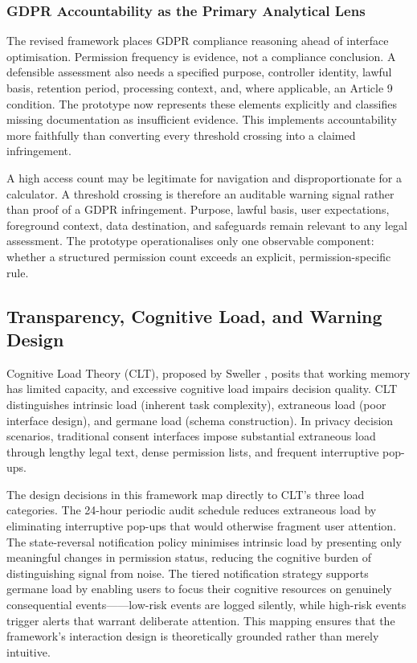 \subsubsection{GDPR Accountability as the Primary Analytical Lens}

The revised framework places GDPR compliance reasoning ahead of interface optimisation. Permission frequency is evidence, not a compliance conclusion. A defensible assessment also needs a specified purpose, controller identity, lawful basis, retention period, processing context, and, where applicable, an Article 9 condition. The prototype now represents these elements explicitly and classifies missing documentation as insufficient evidence. This implements accountability more faithfully than converting every threshold crossing into a claimed infringement.

A high access count may be legitimate for navigation and disproportionate for a calculator. A threshold crossing is therefore an auditable warning signal rather than proof of a GDPR infringement. Purpose, lawful basis, user expectations, foreground context, data destination, and safeguards remain relevant to any legal assessment. The prototype operationalises only one observable component: whether a structured permission count exceeds an explicit, permission-specific rule.

\subsection{Transparency, Cognitive Load, and Warning Design}

Cognitive Load Theory (CLT), proposed by Sweller \cite{27}, posits that working memory has limited capacity, and excessive cognitive load impairs decision quality. CLT distinguishes intrinsic load (inherent task complexity), extraneous load (poor interface design), and germane load (schema construction). In privacy decision scenarios, traditional consent interfaces impose substantial extraneous load through lengthy legal text, dense permission lists, and frequent interruptive pop-ups.

The design decisions in this framework map directly to CLT's three load categories. The 24-hour periodic audit schedule reduces extraneous load by eliminating interruptive pop-ups that would otherwise fragment user attention. The state-reversal notification policy minimises intrinsic load by presenting only meaningful changes in permission status, reducing the cognitive burden of distinguishing signal from noise. The tiered notification strategy supports germane load by enabling users to focus their cognitive resources on genuinely consequential events——low-risk events are logged silently, while high-risk events trigger alerts that warrant deliberate attention. This mapping ensures that the framework's interaction design is theoretically grounded rather than merely intuitive.


